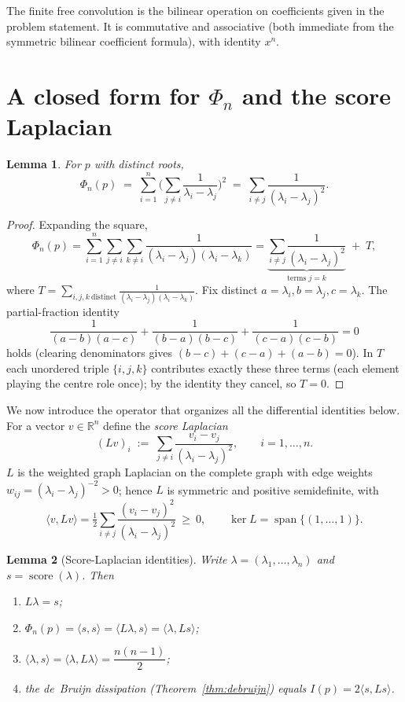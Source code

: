 \documentclass[12pt]{article}
\newtheorem{lemma}{Lemma}
\theoremstyle{remark}
\DeclareMathOperator{\score}{score}
\newcommand{\bR}{\mathbb{R}}
\newcommand{\inner}[2]{\langle #1,#2\rangle}
\begin{document}
The finite free convolution is the bilinear operation on coefficients given in
the problem statement.  It is commutative and associative (both immediate from
the symmetric bilinear coefficient formula), with identity $x^n$.

\section{A closed form for $\Phi_n$ and the score Laplacian}\label{sec:identity}

\begin{lemma}\label{lem:phiform}
For $p$ with distinct roots,
\[
\Phi_n(p)\;=\;\sum_{i=1}^n\Big(\sum_{j\neq i}\frac{1}{\lambda_i-\lambda_j}\Big)^2
\;=\;\sum_{i\neq j}\frac{1}{(\lambda_i-\lambda_j)^2}.
\]
\end{lemma}

\begin{proof}
Expanding the square,
\[
\Phi_n(p)=\sum_{i=1}^n\sum_{j\neq i}\sum_{k\neq i}
\frac{1}{(\lambda_i-\lambda_j)(\lambda_i-\lambda_k)}
=\underbrace{\sum_{i\neq j}\frac{1}{(\lambda_i-\lambda_j)^2}}_{\text{terms }j=k}
\;+\;T,
\]
where $T=\sum_{i,j,k\ \text{distinct}}
\frac{1}{(\lambda_i-\lambda_j)(\lambda_i-\lambda_k)}$.
Fix distinct $a=\lambda_i,b=\lambda_j,c=\lambda_k$.  The partial-fraction
identity
\[
\frac{1}{(a-b)(a-c)}+\frac{1}{(b-a)(b-c)}+\frac{1}{(c-a)(c-b)}=0
\]
holds (clearing denominators gives $(b-c)+(c-a)+(a-b)=0$).  In $T$ each
unordered triple $\{i,j,k\}$ contributes exactly these three terms (each
element playing the centre role once); by the identity they cancel, so $T=0$.
\end{proof}

We now introduce the operator that organizes all the differential identities
below.  For a vector $v\in\bR^n$ define the \emph{score Laplacian}
\[
(Lv)_i\;:=\;\sum_{j\neq i}\frac{v_i-v_j}{(\lambda_i-\lambda_j)^2},
\qquad i=1,\dots,n .
\]
$L$ is the weighted graph Laplacian on the complete graph with edge weights
$w_{ij}=(\lambda_i-\lambda_j)^{-2}>0$; hence $L$ is symmetric and positive
semidefinite, with
\[
\inner{v}{Lv}=\tfrac12\sum_{i\neq j}\frac{(v_i-v_j)^2}{(\lambda_i-\lambda_j)^2}\ \ge\ 0,
\qquad \ker L=\operatorname{span}\{(1,\dots,1)\}. \tag{2.1}
\]

\begin{lemma}[Score-Laplacian identities]\label{lem:Lid}
Write $\lambda=(\lambda_1,\dots,\lambda_n)$ and $s=\score(\lambda)$.  Then
\begin{enumerate}
\item[(i)] $L\lambda=s$;
\item[(ii)] $\Phi_n(p)=\inner{s}{s}=\inner{L\lambda}{s}=\inner{\lambda}{Ls}$;
\item[(iii)] $\inner{\lambda}{s}=\inner{\lambda}{L\lambda}=\dfrac{n(n-1)}{2}$;
\item[(iv)] the de~Bruijn dissipation (Theorem~\ref{thm:debruijn}) equals
$I(p)=2\inner{s}{Ls}$.
\end{enumerate}
\end{lemma}
\end{document}
